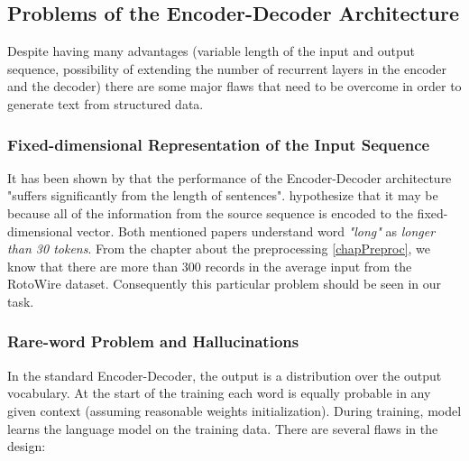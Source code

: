 \subsection{Problems of the Encoder-Decoder Architecture}

Despite having many advantages (variable length of the input and output sequence, possibility of extending the number of recurrent layers in the encoder and the decoder) there are some major flaws that need to be overcome in order to generate text from structured data.

\subsubsection{Fixed-dimensional Representation of the Input Sequence} \label{fixed_repre_problem}

It has been shown by \citep{cho2014properties} that the performance of the Encoder-Decoder architecture "suffers significantly from the length of sentences". \citep{bahdanau2016neural} hypothesize that it may be because all of the information from the source sequence is encoded to the fixed-dimensional vector. Both mentioned papers understand word \emph{"long"} as \emph{longer than 30 tokens}. From the chapter about the preprocessing \ref{chapPreproc}, we know that there are more than 300 records in the average input from the RotoWire dataset. Consequently this particular problem should be seen in our task. 

\subsubsection{Rare-word Problem and Hallucinations} \label{rare_word_problem}

In the standard Encoder-Decoder, the output is a distribution over the output vocabulary. At the start of the training each word is equally probable in any given context (assuming reasonable weights initialization). During training, model learns the language model on the training data. There are several flaws in the design:

